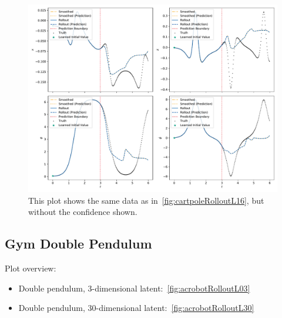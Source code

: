 		\begin{figure}
			\centering
			\includegraphics[width=\linewidth]{figures/results/cartpole-gym/run-latent-dim-16/without-confidence/rollout-observations-N0.pdf}
			\caption{This plot shows the same data as in~\autoref{fig:cartpoleRolloutL16}, but without the confidence shown.}
			\label{fig:cartpoleRolloutL16Appendix}
		\end{figure}

	\subsection{Gym Double Pendulum}
		Plot overview:
		\begin{itemize}
			\item Double pendulum, 3-dimensional latent:~\autoref{fig:acrobotRolloutL03}
			\item Double pendulum, 30-dimensional latent:~\autoref{fig:acrobotRolloutL30}
		\end{itemize}

